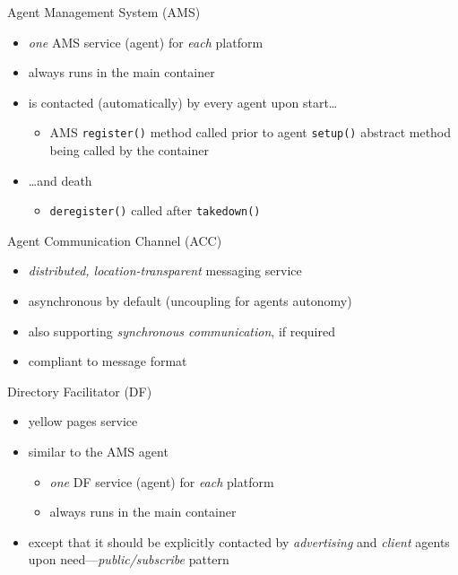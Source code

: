 \documentclass{beamer}\mode<presentation>{\usetheme{AMSCesenaPurpleAndGold}}
\begin{document}
\begin{frame}[c,allowframebreaks]
\begin{block}{Agent Management System (AMS)}
\begin{itemize}
            \item \emph{one} AMS service (agent) for \emph{each} \jade{} platform
            \item always runs in the main container
            \item is contacted (automatically) by every \jade{} agent upon start\ldots
            \begin{itemize}
                \item AMS \texttt{register()} method called prior to agent \texttt{setup()} abstract method being called by the container
            \end{itemize}
            \item \ldots and death
            \begin{itemize}
                \item \texttt{deregister()} called after \texttt{takedown()}
            \end{itemize}
        \end{itemize}
    \end{block}
    \begin{block}{Agent Communication Channel (ACC)}
        \begin{itemize}
            \item \jade{} \emph{distributed, location-transparent} \alert{messaging service}
            \item \alert{asynchronous} by default (uncoupling for agents autonomy)
            \item also supporting \emph{synchronous communication}, if required
            \item compliant to \fipa{} \acl{} message format
        \end{itemize}
    \end{block}
    \begin{block}{Directory Facilitator (DF)}
        \begin{itemize}
            \item \jade{} \alert{yellow pages} service
            \item similar to the AMS agent
            \begin{itemize}
                \item \emph{one} DF service (agent) for \emph{each} \jade{} platform
                \item always runs in the main container
            \end{itemize}
            \item except that it should be explicitly contacted by \emph{advertising} and \emph{client} agents upon need---\emph{public/subscribe} pattern
        \end{itemize}
    \end{block}
\end{frame}
\end{document}
